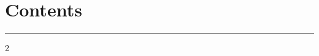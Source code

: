 \section*{\color{accent}Contents}
\vspace{-4pt}
{\color{rulecolor}\rule{\linewidth}{0.4pt}}
\vspace{4pt}

\begin{multicols}{2}
\renewcommand{\contentsname}{}
\tableofcontents
\end{multicols}

\bigskip

